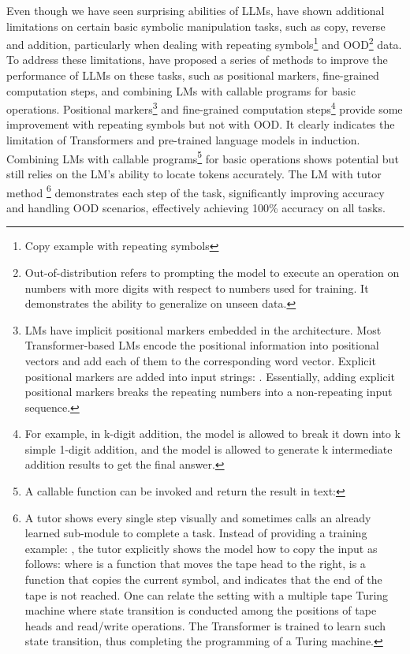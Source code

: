 Even though we have seen surprising abilities of LLMs, \textcite{qian2022limitations} have shown additional limitations on certain basic symbolic manipulation tasks, such as copy, reverse and addition, particularly when dealing with repeating symbols\footnote{Copy example with repeating symbols } and OOD\footnote{Out-of-distribution refers to prompting the model to execute an operation on numbers with more digits with respect to numbers used for training. It demonstrates the ability to generalize on unseen data.} data.
To address these limitations, \textcite{qian2022limitations} have proposed a series of methods to improve the performance of LLMs on these tasks, such as positional markers, fine-grained computation steps, and combining LMs with callable programs for basic operations.
Positional markers\footnote{LMs have implicit positional markers embedded in the architecture. Most Transformer-based LMs encode the positional information into positional vectors and add each of
	them to the corresponding word vector. Explicit positional markers are added into input strings: .
	Essentially, adding explicit positional markers breaks the repeating numbers into a non-repeating input sequence.} and fine-grained computation steps\footnote{For example, in k-digit addition, the model is allowed to break it down into k simple 1-digit addition, and the model is allowed to generate k intermediate addition results to get the final answer.} provide some improvement with repeating symbols but not with OOD\@.
It clearly indicates the limitation of Transformers and pre-trained language models in induction.
Combining LMs with callable programs\footnote{A callable function  can be invoked and return the result in text: } for basic operations shows potential but still relies on the LM's ability to locate tokens accurately.
The LM with tutor method
\footnote{A tutor shows every single step visually and sometimes calls an already learned sub-module to complete a task. Instead of providing a training example: , the tutor explicitly shows the model how to copy the input as follows:  where  is a function that moves the tape head to the right,  is a function that copies the current symbol, and  indicates that the end of the tape is not reached. One can relate the setting with a multiple tape Turing machine where state transition is conducted among the positions of tape heads and read/write operations. The Transformer is trained to learn such state transition, thus completing the programming of a Turing machine.} demonstrates each step of the task, significantly improving accuracy and handling OOD scenarios, effectively achieving 100\% accuracy on all tasks.

